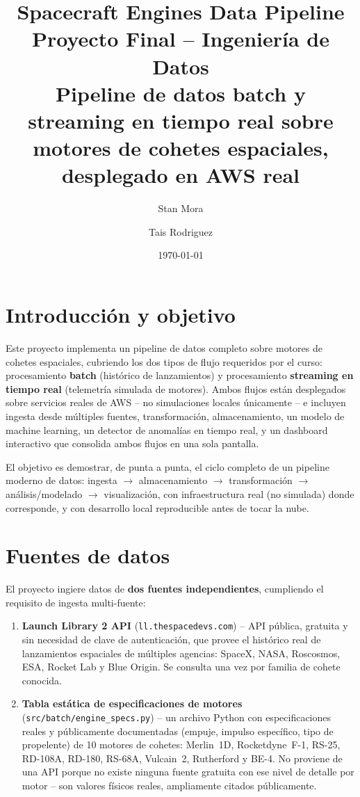 \documentclass[11pt]{article}
\title{\textbf{Spacecraft Engines Data Pipeline} \\
\large Proyecto Final -- Ingeniería de Datos \\
\large Pipeline de datos batch y streaming en tiempo real sobre motores de cohetes espaciales, desplegado en AWS real}
\author{Stan Mora \and Tais Rodriguez}
\date{\today}
\begin{document}
\maketitle
\tableofcontents
\newpage

\section{Introducción y objetivo}

Este proyecto implementa un pipeline de datos completo sobre motores de cohetes espaciales, cubriendo los dos tipos de flujo requeridos por el curso: procesamiento \textbf{batch} (histórico de lanzamientos) y procesamiento \textbf{streaming en tiempo real} (telemetría simulada de motores). Ambos flujos están desplegados sobre servicios reales de AWS -- no simulaciones locales únicamente -- e incluyen ingesta desde múltiples fuentes, transformación, almacenamiento, un modelo de machine learning, un detector de anomalías en tiempo real, y un dashboard interactivo que consolida ambos flujos en una sola pantalla.

El objetivo es demostrar, de punta a punta, el ciclo completo de un pipeline moderno de datos: ingesta $\rightarrow$ almacenamiento $\rightarrow$ transformación $\rightarrow$ análisis/modelado $\rightarrow$ visualización, con infraestructura real (no simulada) donde corresponde, y con desarrollo local reproducible antes de tocar la nube.

\section{Fuentes de datos}

El proyecto ingiere datos de \textbf{dos fuentes independientes}, cumpliendo el requisito de ingesta multi-fuente:

\begin{enumerate}
    \item \textbf{Launch Library 2 API} (\texttt{ll.thespacedevs.com}) -- API pública, gratuita y sin necesidad de clave de autenticación, que provee el histórico real de lanzamientos espaciales de múltiples agencias: SpaceX, NASA, Roscosmos, ESA, Rocket Lab y Blue Origin. Se consulta una vez por familia de cohete conocida.

    \item \textbf{Tabla estática de especificaciones de motores} (\texttt{src/batch/engine\_specs.py}) -- un archivo Python con especificaciones reales y públicamente documentadas (empuje, impulso específico, tipo de propelente) de 10 motores de cohetes: Merlin~1D, Rocketdyne~F-1, RS-25, RD-108A, RD-180, RS-68A, Vulcain~2, Rutherford y BE-4. No proviene de una API porque no existe ninguna fuente gratuita con ese nivel de detalle por motor -- son valores físicos reales, ampliamente citados públicamente.
\end{enumerate}
\end{document}
